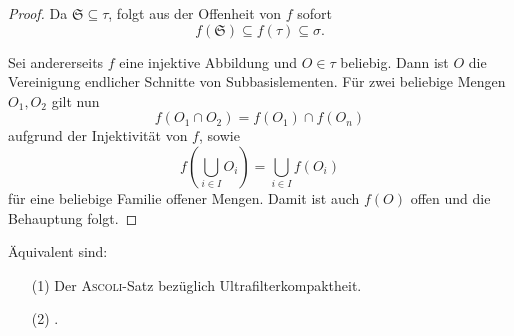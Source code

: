 \begin{proof}
  Da $\mathfrak{S} \subseteq \tau$, folgt aus der Offenheit von $f$ sofort 
  \begin{displaymath}
    f(\mathfrak{S}) \subseteq f(\tau) \subseteq \sigma.
  \end{displaymath}

  Sei andererseits $f$ eine injektive Abbildung und $O \in \tau$ beliebig.
  Dann ist $O$ die Vereinigung endlicher Schnitte von Subbasislementen.
  Für zwei beliebige Mengen $O_1,O_2$ gilt nun 
  \begin{displaymath}
    f(O_1 \cap O_2) = f(O_1) \cap f(O_n)
  \end{displaymath}
  aufgrund der Injektivität von $f$, sowie 
  \begin{displaymath}
    f \left(\bigcup_{i \in I} O_i \right) = \bigcup_{i \in I} f(O_i)
  \end{displaymath}
  für eine beliebige Familie offener Mengen.
  Damit ist auch $f(O)$ offen und die Behauptung folgt.
\end{proof}

\begin{thm}
  \label{thm:ultrafiltercompact}
  Äquivalent sind:
  \begin{enumerate}
    \item[(1)] Der \textsc{Ascoli}-Satz bezüglich Ultrafilterkompaktheit.
    \item[(2)] \PIT.
  \end{enumerate}
\end{thm}

